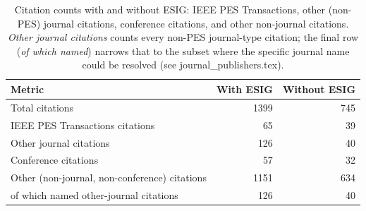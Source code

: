\begin{table}[htbp]
\centering
\small
\begin{tabular}{lrr}
\toprule
Metric & With ESIG & Without ESIG \\
\midrule
    Total citations & 1399 & 745 \\
    IEEE PES Transactions citations & 65 & 39 \\
    Other journal citations & 126 & 40 \\
    Conference citations & 57 & 32 \\
    Other (non-journal, non-conference) citations & 1151 & 634 \\
\midrule
    \quad of which named other-journal citations & 126 & 40 \\
\bottomrule
\end{tabular}
\caption{Citation counts with and without ESIG: IEEE PES Transactions, other (non-PES) journal citations, conference citations, and other non-journal citations. \emph{Other journal citations} counts every non-PES journal-type citation; the final row (\emph{of which named}) narrows that to the subset where the specific journal name could be resolved (see journal\_publishers.tex).}
\label{tab:citation_counts_summary}
\end{table}
